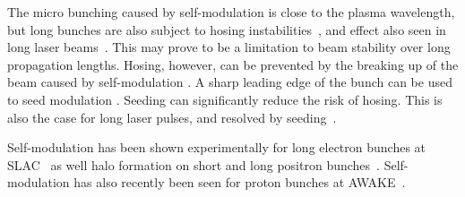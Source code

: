 The micro bunching caused by self-modulation is close to the plasma wavelength, but long bunches are also subject to hosing instabilities~\cite{whittum:1991}, and effect also seen in long laser beams~\cite{duda:1999,duda:2000}.
This may prove to be a limitation to beam stability over long propagation lengths.
Hosing, however, can be prevented by the breaking up of the beam caused by self-modulation \cite{vieira:2014}.
A sharp leading edge of the bunch can be used to seed modulation \cite{fang:2014}. Seeding can significantly reduce the risk of hosing.
This is also the case for long laser pulses, and resolved by seeding~\cite{vieira:2012}. 

Self-modulation has been shown experimentally for long electron bunches at SLAC~\cite{muggli:2014,muggli:2015} as well halo formation on short and long positron bunches~\cite{muggli:2008,hogan:2003}.
Self-modulation has also recently been seen for proton bunches at AWAKE~\cite{muggli:2017a}.

